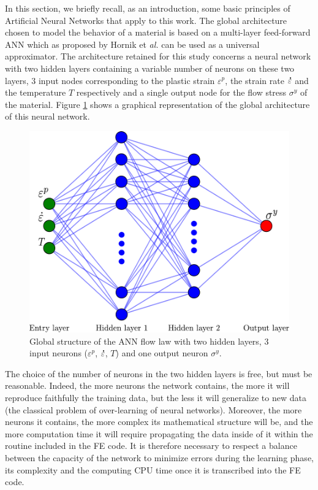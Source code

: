 \documentclass[algorithms,article,submit,pdftex,moreauthors]{Definitions/mdpi}
\makeatletter
\DeclareRobustCommand{\mdot}[1]{\accentset{\mbox{\bfseries .}}{#1}}
\DeclareRobustCommand{\eal}{et \emph{al.}\@\xspace}
\makeatother
\begin{document}
In this section, we briefly recall, as an introduction, some basic principles of Artificial Neural Networks that apply to this work.
The global architecture chosen to model the behavior of a material is based on a multi-layer feed-forward ANN which as proposed by Hornik \eal \cite{Hornik-1989} can be used as a universal approximator.
The architecture retained for this study concerns a neural network with two hidden layers containing a variable number of neurons on these two layers, $3$ input nodes corresponding to the plastic strain $\varepsilon^p$, the strain rate $\mdot\varepsilon$ and the temperature $T$ respectively and a single output node for the flow stress $\sigma^y$ of the material.
Figure \ref{fig:ANN-scheme} shows a graphical representation of the global architecture of this neural network.
\begin{figure}[!ht]
\centering
\includegraphics[width=0.7\columnwidth]{Figures/ANN-scheme-2HL}
\caption{Global structure of the ANN flow law with two hidden layers, 3 input neurons ($\varepsilon^p$, $\mdot\varepsilon$, $T$) and one output neuron $\sigma^y$.}
\label{fig:ANN-scheme}
\end{figure}
The choice of the number of neurons in the two hidden layers is free, but must be reasonable.
Indeed, the more neurons the network contains, the more it will reproduce faithfully the training data, but the less it will generalize to new data (the classical problem of over-learning of neural networks).
Moreover, the more neurons it contains, the more complex its mathematical structure will be, and the more computation time it will require propagating the data inside of it within the routine included in the FE code.
It is therefore necessary to respect a balance between the capacity of the network to minimize errors during the learning phase, its complexity and the computing CPU time once it is transcribed into the FE code.
\end{document}
